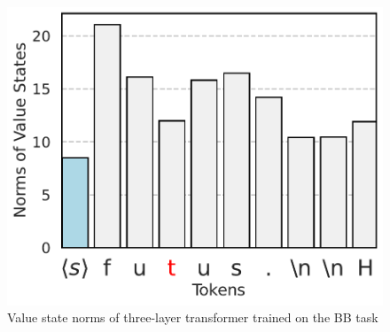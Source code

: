 \begin{figure}[h]
\begin{minipage}{0.3\textwidth}
  \end{minipage}
  \begin{minipage}{0.3\textwidth}
      \centering
      \vspace{-.2em}
      \includegraphics[width=\linewidth]{Figures/BBM_appendix/value_states_layer_2.pdf}
  \end{minipage}
  \caption{\small Value state norms of three-layer transformer trained on the BB task}
  \label{appfigure:massive-value-norm}
  \vspace{-1em}
\end{figure}


